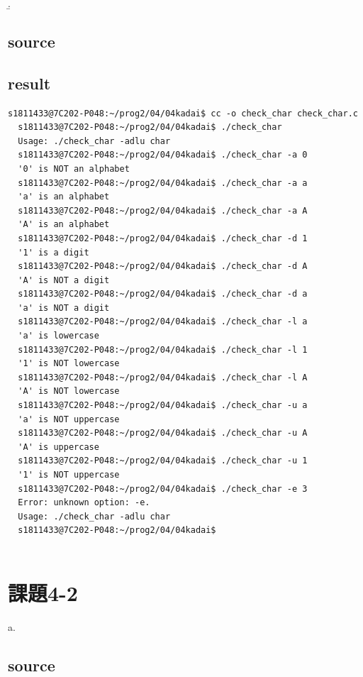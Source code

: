 \documentclass[10pt,a4paper]{jsarticle}
\begin{document}
\b.

\subsection{source}


\subsection{result}

\begin{lstlisting}[basicstyle=\ttfamily\footnotesize,frame=single]
  s1811433@7C202-P048:~/prog2/04/04kadai$ cc -o check_char check_char.c
  s1811433@7C202-P048:~/prog2/04/04kadai$ ./check_char
  Usage: ./check_char -adlu char
  s1811433@7C202-P048:~/prog2/04/04kadai$ ./check_char -a 0
  '0' is NOT an alphabet
  s1811433@7C202-P048:~/prog2/04/04kadai$ ./check_char -a a
  'a' is an alphabet
  s1811433@7C202-P048:~/prog2/04/04kadai$ ./check_char -a A
  'A' is an alphabet
  s1811433@7C202-P048:~/prog2/04/04kadai$ ./check_char -d 1
  '1' is a digit
  s1811433@7C202-P048:~/prog2/04/04kadai$ ./check_char -d A
  'A' is NOT a digit
  s1811433@7C202-P048:~/prog2/04/04kadai$ ./check_char -d a
  'a' is NOT a digit
  s1811433@7C202-P048:~/prog2/04/04kadai$ ./check_char -l a
  'a' is lowercase
  s1811433@7C202-P048:~/prog2/04/04kadai$ ./check_char -l 1
  '1' is NOT lowercase
  s1811433@7C202-P048:~/prog2/04/04kadai$ ./check_char -l A
  'A' is NOT lowercase
  s1811433@7C202-P048:~/prog2/04/04kadai$ ./check_char -u a
  'a' is NOT uppercase
  s1811433@7C202-P048:~/prog2/04/04kadai$ ./check_char -u A
  'A' is uppercase
  s1811433@7C202-P048:~/prog2/04/04kadai$ ./check_char -u 1
  '1' is NOT uppercase
  s1811433@7C202-P048:~/prog2/04/04kadai$ ./check_char -e 3
  Error: unknown option: -e.
  Usage: ./check_char -adlu char
  s1811433@7C202-P048:~/prog2/04/04kadai$
  
\end{lstlisting}


\section{課題4-2}
\noindent a.
\subsection{source}

\end{document}
